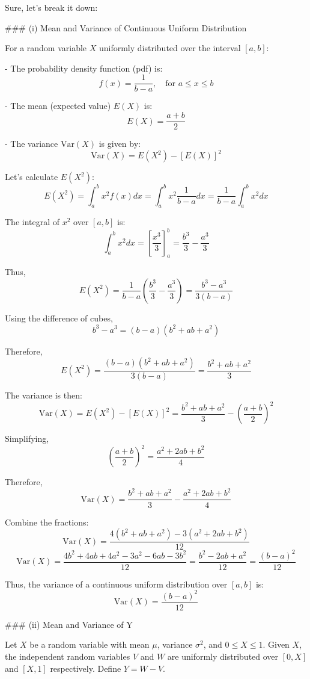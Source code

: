 Sure, let's break it down:

### (i) Mean and Variance of Continuous Uniform Distribution

For a random variable \(X\) uniformly distributed over the interval \([a, b]\):

- The probability density function (pdf) is:
  \[
  f(x) = \frac{1}{b - a}, \quad \text{for } a \leq x \leq b
  \]

- The mean (expected value) \(E(X)\) is:
  \[
  E(X) = \frac{a + b}{2}
  \]

- The variance \( \text{Var}(X) \) is given by:
  \[
  \text{Var}(X) = E(X^2) - [E(X)]^2
  \]

  Let's calculate \(E(X^2)\):
  \[
  E(X^2) = \int_{a}^{b} x^2 f(x) dx = \int_{a}^{b} x^2 \frac{1}{b - a} dx = \frac{1}{b - a} \int_{a}^{b} x^2 dx
  \]

  The integral of \(x^2\) over \([a, b]\) is:
  \[
  \int_{a}^{b} x^2 dx = \left[ \frac{x^3}{3} \right]_{a}^{b} = \frac{b^3}{3} - \frac{a^3}{3}
  \]

  Thus,
  \[
  E(X^2) = \frac{1}{b - a} \left( \frac{b^3}{3} - \frac{a^3}{3} \right) = \frac{b^3 - a^3}{3(b - a)}
  \]

  Using the difference of cubes,
  \[
  b^3 - a^3 = (b - a)(b^2 + ab + a^2)
  \]

  Therefore,
  \[
  E(X^2) = \frac{(b - a)(b^2 + ab + a^2)}{3(b - a)} = \frac{b^2 + ab + a^2}{3}
  \]

  The variance is then:
  \[
  \text{Var}(X) = E(X^2) - [E(X)]^2 = \frac{b^2 + ab + a^2}{3} - \left(\frac{a + b}{2}\right)^2
  \]

  Simplifying,
  \[
  \left(\frac{a + b}{2}\right)^2 = \frac{a^2 + 2ab + b^2}{4}
  \]

  Therefore,
  \[
  \text{Var}(X) = \frac{b^2 + ab + a^2}{3} - \frac{a^2 + 2ab + b^2}{4}
  \]

  Combine the fractions:
  \[
  \text{Var}(X) = \frac{4(b^2 + ab + a^2) - 3(a^2 + 2ab + b^2)}{12}
  \]
  \[
  \text{Var}(X) = \frac{4b^2 + 4ab + 4a^2 - 3a^2 - 6ab - 3b^2}{12} = \frac{b^2 - 2ab + a^2}{12} = \frac{(b - a)^2}{12}
  \]

Thus, the variance of a continuous uniform distribution over \([a, b]\) is:
\[ \text{Var}(X) = \frac{(b - a)^2}{12} \]

### (ii) Mean and Variance of Y

Let \(X\) be a random variable with mean \( \mu \), variance \( \sigma^2 \), and \( 0 \leq X \leq 1 \).
Given \(X\), the independent random variables \(V\) and \(W\) are uniformly distributed over \([0, X]\) and \([X, 1]\) respectively.
Define \(Y = W - V\).

